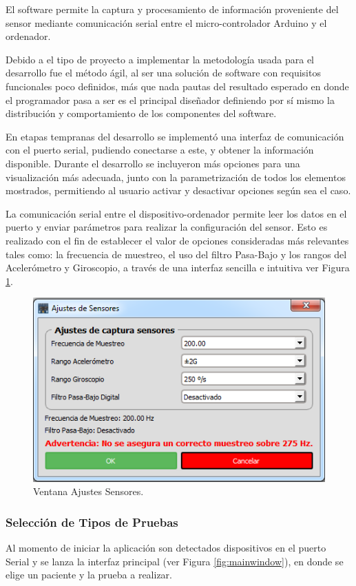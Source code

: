 \documentclass[12pt,a4paper]{article}
\begin{document}
El software permite la captura y procesamiento de información proveniente del sensor mediante comunicación serial entre el micro-controlador Arduino y el ordenador.

Debido a el tipo de proyecto a implementar la metodología usada para el desarrollo fue el método ágil, al ser una solución de software con requisitos funcionales poco definidos, más que nada pautas del resultado esperado en donde el programador pasa a ser es el principal diseñador definiendo por sí mismo la distribución y comportamiento de los componentes del software.

En etapas tempranas del desarrollo se implementó una interfaz de comunicación con el puerto serial, pudiendo conectarse a este, y obtener la información disponible.
Durante el desarrollo se incluyeron más opciones para una visualización más adecuada, junto con la parametrización de todos los elementos mostrados, permitiendo al usuario activar y desactivar opciones según sea el caso.

La comunicación serial entre el dispositivo-ordenador permite leer los datos en el puerto y enviar parámetros para realizar la configuración del sensor.
Esto es realizado con el fin de establecer el valor de opciones consideradas más relevantes tales como: la frecuencia de muestreo, el uso del filtro Pasa-Bajo y los rangos del Acelerómetro y Giroscopio, a través de una interfaz sencilla e intuitiva ver Figura \ref{fig:ajustessensores}.

\begin{figure}[H]
	\centering
	\includegraphics[scale=0.6]{images/ajustesSensores}
	\caption{Ventana Ajustes Sensores.}
	\label{fig:ajustessensores}
\end{figure}

\newpage
\subsubsection{Selección de Tipos de Pruebas}
Al momento de iniciar la aplicación son detectados dispositivos en el puerto Serial y se lanza la interfaz principal (ver Figura \ref{fig:mainwindow}), en donde se elige un paciente y la prueba a realizar.
\end{document}
